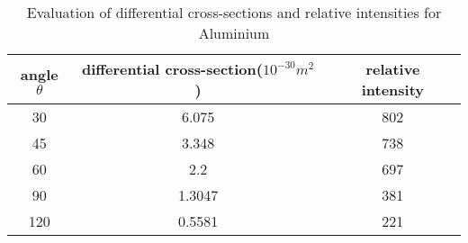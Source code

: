 \begin{table}
    \centering
    \begin{tabular}{|c|c|c|}
        \hline
        angle $\theta$ & differential cross-section($10^{-30}m^2$) & relative intensity \\ \hline
        30             & 6.075                                     & 802                \\ \hline
        45             & 3.348                                     & 738                \\ \hline
        60             & 2.2                                       & 697                \\ \hline
        90             & 1.3047                                    & 381                \\ \hline
        120            & 0.5581                                    & 221                \\ \hline
    \end{tabular}
    \caption{Evaluation of differential cross-sections and relative intensities for Aluminium}
    \label{tab:2}
\end{table}